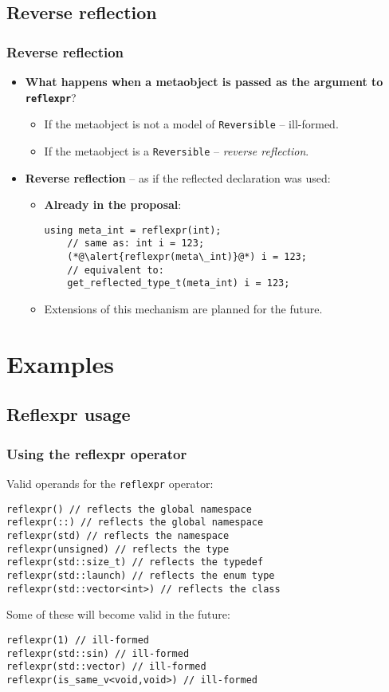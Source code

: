 \documentclass[compress,table,xcolor=table]{beamer}
\begin{document}
\subsection{Reverse reflection}
\begin{frame}[fragile]
\frametitle{Reverse reflection}
  \begin{itemize}
    \item {\large \textbf{What happens when a metaobject is passed as the argument
      to \texttt{reflexpr}}?}
    \begin{itemize}
      \item If the metaobject is not a model of \texttt{Reversible} -- ill-formed.
      \item If the metaobject is a \texttt{Reversible} -- {\em reverse reflection}.
    \end{itemize}
    \item \textbf{Reverse reflection} -- as if the reflected declaration was used:
    \begin{itemize}
      \item \textbf{Already in the proposal}:
      \begin{lstlisting}[basicstyle=\small\ttfamily]
	using meta_int = reflexpr(int);
	// same as: int i = 123;
	(*@\alert{reflexpr(meta\_int)}@*) i = 123;
	// equivalent to:
	get_reflected_type_t(meta_int) i = 123;
      \end{lstlisting}
      \item Extensions of this mechanism are planned for the future.
    \end{itemize}
  \end{itemize}
\end{frame}

\section{Examples}

\subsection{Reflexpr usage}
\begin{frame}[fragile]
\frametitle{Using the reflexpr operator}

Valid operands for the \texttt{reflexpr} operator:
\begin{lstlisting}[basicstyle=\small\ttfamily]
reflexpr() // reflects the global namespace
reflexpr(::) // reflects the global namespace
reflexpr(std) // reflects the namespace
reflexpr(unsigned) // reflects the type
reflexpr(std::size_t) // reflects the typedef
reflexpr(std::launch) // reflects the enum type
reflexpr(std::vector<int>) // reflects the class
\end{lstlisting}

Some of these will become valid in the future:
\begin{lstlisting}[basicstyle=\small\ttfamily]
reflexpr(1) // ill-formed
reflexpr(std::sin) // ill-formed
reflexpr(std::vector) // ill-formed
reflexpr(is_same_v<void,void>) // ill-formed
\end{lstlisting}
\end{frame}
\end{document}
